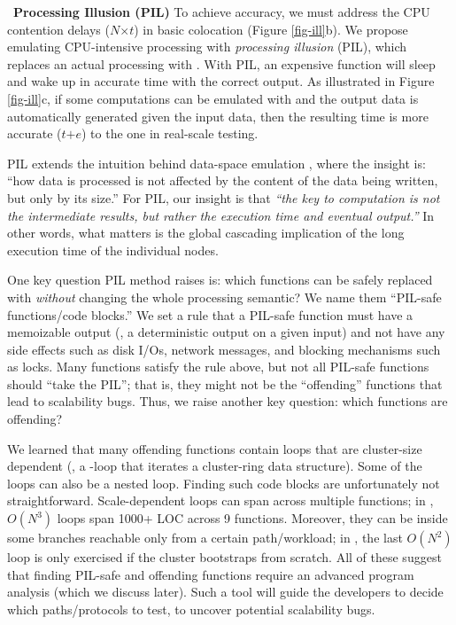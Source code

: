 


\vnb\ {\bf Processing Illusion (PIL)}
%
To achieve accuracy, we must address the CPU contention delays
($N$$\times$$t$) in basic colocation (Figure \ref{fig-ill}b).
%
We propose  emulating CPU-intensive processing with {\em
  processing illusion} (PIL), which replaces an actual processing with
\sleep.
%
With PIL, an expensive function will sleep and wake up in accurate time
with the correct output.
%
As illustrated in Figure \ref{fig-ill}c, if some computations can be
emulated with  and the output data is automatically generated
given the input data, then the resulting time is more accurate ($t$$+$$e$)
to the one in real-scale testing.



PIL extends the intuition behind data-space emulation
\cite{Wang+14-Exalt}, where the insight is: ``how data is processed is not
affected by the content of the data being written, but only by its size.''
%
For PIL, our insight is that {\em ``the key to computation is not the
  intermediate results, but rather the execution time and eventual
  output.''}
%
In other words, what matters is the global cascading implication of the
long execution time of the individual nodes.


 One key question PIL
method raises is: which functions can be safely replaced with \sleep
\textit{without} changing the whole processing semantic?  We name them
``PIL-safe functions/code blocks.''
%
We set a rule that a PIL-safe function must have a memoizable output (\ie,
a deterministic output on a given input) and not have any side effects
such as disk I/Os, network messages, and blocking mechanisms such as
locks.  
%
Many functions satisfy the rule above, but not all PIL-safe functions
should ``take the PIL''; that is, they might not be the ``offending''
functions that lead to scalability bugs.  Thus, we raise another key
question: which functions are offending?


We learned that many offending functions contain loops that are
cluster-size dependent (\eg, a -loop that iterates a cluster-ring
data structure).  Some of the loops can also be a nested loop.
%
Finding such code blocks are unfortunately not straightforward.
Scale-dependent loops can span across multiple functions; in \caone,
$O(N^3)$ loops span 1000+ LOC across 9 functions.  Moreover, they can be
inside some  branches reachable only from a certain
path/workload; in \caone, the last $O(N^2)$ loop is only exercised
if the cluster bootstraps from scratch.
%
All of these suggest that finding PIL-safe and offending functions require
an advanced program analysis (which we discuss later).  Such a tool will
guide the developers to decide which paths/protocols to test, to uncover
potential scalability bugs.




